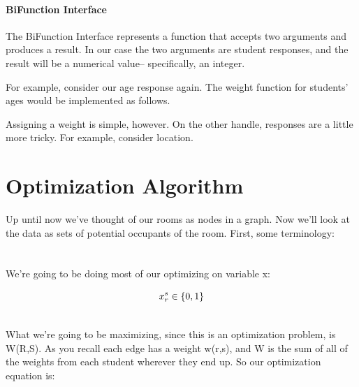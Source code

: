 \documentclass[12pt]{article}
\begin{document}
\paragraph{BiFunction Interface}
The BiFunction Interface represents a function that accepts two arguments and produces a result. In our case the two arguments are student responses, and the result will be a numerical value-- specifically, an integer. 

For example, consider our age response again. The weight function for students' ages would be implemented as follows.


Assigning a weight is simple, however. On the other handle, responses are a little more tricky. For example, consider location. 


\section{Optimization Algorithm}

Up until now we've thought of our rooms as nodes in a graph. Now we'll look at the data as sets of potential occupants of the room. First, some terminology:\\

\\
\\ 

\noindent We're going to be doing most of our optimizing on variable x:

\begin{equation*}
\noindent{x_r^s \in \{0, 1\}\\} 
\end{equation*}


\\

What we're going to be maximizing, since this is an optimization problem, is W(R,S). As you recall each edge has a weight w(r,s), and W is the sum of all of the weights from each student wherever they end up. So our optimization equation is:\\
\end{document}
